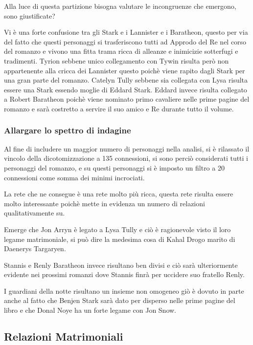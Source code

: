 \documentclass[a4paper]{article}
\begin{document}
Alla luce di questa partizione bisogna valutare le incongruenze che emergono, sono giustificate?

Vi è una forte confusione tra gli Stark e i Lannister e i Baratheon, questo per via del fatto che questi personaggi si trasferiscono tutti ad Approdo del Re nel corso del romanzo e vivono una fitta trama ricca di alleanze e inimicizie sotterfugi e tradimenti.
Tyrion sebbene unico collegamento con Tywin risulta però non appartenente alla cricca dei Lannister questo poichè viene rapito dagli Stark per una gran parte del romanzo.
Catelyn Tully sebbene sia collegata con Lysa risulta essere una Stark essendo moglie di Eddard Stark.
Eddard invece risulta collegato a Robert Baratheon poichè viene nominato primo cavaliere nelle prime pagine del romanzo e sarà costretto a servire il suo amico e Re durante tutto il volume.


\subsubsection{Allargare lo spettro di indagine}

Al fine di includere un maggior numero di personaggi nella analisi, si è rilassato il vincolo della dicotomizzazione a 135 connessioni, si sono perciò considerati tutti i personaggi del romanzo, e su questi personaggi si è imposto un filtro a 20 connessioni come somma dei minimi incrociati.

La rete che ne consegue è una rete molto più ricca, questa rete risulta essere molto interessante poichè mette in evidenza un numero di relazioni qualitativamente su.

Emerge che Jon Arryn è legato a Lysa Tully e ciò è ragionevole visto il loro legame matrimoniale, si può dire la medesima cosa di Kahal Drogo marito di Daenerys Targaryen.

Stannis e Renly Baratheon invece risultano ben divisi e ciò sarà ulteriormente evidente nei prossimi romanzi dove Stannis finrà per uccidere suo fratello Renly.

I guardiani della notte risultano un insieme non omogeneo giò è dovuto in parte anche al fatto che Benjen Stark sarà dato per disperso nelle prime pagine del libro e che Donal Noye ha un forte legame con Jon Snow.


\subsection{Relazioni Matrimoniali}
\end{document}
